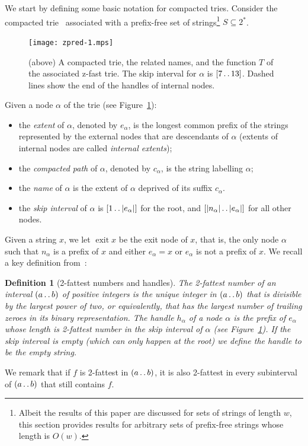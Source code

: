 \documentclass[a4paper,11pt]{article}
\newtheorem{definition}[theorem]{Definition}
\newcommand{\?}{\mskip1.5mu}
\def\..{\,\mathpunct{\ldotp\ldotp}} %
\DeclareMathOperator{\exit}{exit}
\begin{document}
We start by defining some basic notation for compacted tries. Consider the compacted
trie~\cite{Knuth98} associated with a prefix-free set of strings\footnote{Albeit
the results of this paper are discussed for sets of strings
of length $w$, this section provides results for arbitrary sets of prefix-free strings whose length is
$O(w)$.} $S\subseteq 2^*$. \begin{figure}[t]
\centering
\texttt{[image: zpred-1.mps]}\qquad{}
\caption{\label{fig:ztrie}(above) A compacted trie, the related names, and the
function $T$ of the associated z-fast trie. The skip interval for $\alpha$ is
$[7\..13]$. Dashed lines show the end of the handles of internal nodes.}
\end{figure}
Given a node $\alpha$ of the trie (see Figure~\ref{fig:ztrie}):
\begin{itemize}
	\item the \emph{extent} of $\alpha$, denoted by $e_\alpha$, is the longest
	common prefix of the strings represented by the external nodes 
	that are descendants of $\alpha$ (extents of internal nodes are called
	\emph{internal extents});
	\item the \emph{compacted path} of $\alpha$, denoted by $c_\alpha$, is the
	string labelling $\alpha$;
 	\item the \emph{name} of $\alpha$ is the extent of $\alpha$
 	deprived of its suffix $c_\alpha$.
	\item the \emph{skip interval} of $\alpha$ is $[1\..|e_\alpha|]$ for the root, and $[|n_\alpha|\..|e_\alpha|]$
	for all other nodes.
\end{itemize}

Given a string $x$, we let $\exit x$ be the exit node of $x$, that is, the
only node $\alpha$ such that $n_\alpha$ is a prefix of $x$ and
either $e_\alpha=x$ or $e_\alpha$ is not a prefix of $x$.
We recall a key definition from~\cite{BelazzouguiBoPaVi09}:

\begin{definition}[2-fattest numbers and handles] 
\label{def:twofattest}
The \emph{2-fattest number} of an interval
$(a\..b)$ of positive integers is the unique integer in $(a\..b)$ that is
divisible by the largest power of two, or equivalently, that has the largest
number of trailing zeroes in its binary representation. The \emph{handle}
$h_\alpha$ of a node $\alpha$ is the prefix of $e_\alpha$ whose length is 2-fattest number in the skip interval of $\alpha$
(see Figure~\ref{fig:ztrie}). If the skip interval is empty (which can only
happen at the root) we define the handle to be the empty string.
\end{definition}
We remark that if $f$ is 2-fattest in $(a\..b)$, it is also 2-fattest in every
subinterval of $(a\..b)$ that still contains $f$.
\end{document}
